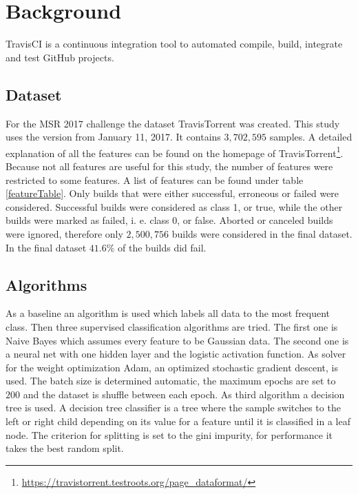 \documentclass[a4paper,11pt]{article}
\begin{document}
\section{Background}

TravisCI is a continuous integration tool to automated compile, build, integrate and test GitHub projects. 

\subsection{Dataset}

For the MSR 2017 challenge the dataset TravisTorrent was created. This study uses the version from January 11, 2017. It contains $3,702,595$ samples. A detailed explanation of all the features can be found on the homepage of TravisTorrent\footnote{\url{https://travistorrent.testroots.org/page_dataformat/}}. Because not all features are useful for this study, the number of features were restricted to some features. A list of features can be found under table \ref{featureTable}. Only builds that were either successful, erroneous or failed were considered. Successful builds were considered as class 1, or true, while the other builds were marked as failed, i. e. class 0, or false. Aborted or canceled builds were ignored, therefore only $2,500,756$ builds were considered in the final dataset. In the final dataset $41.6\%$ of the builds did fail. 


\subsection{Algorithms}

As a baseline an algorithm is used which labels all data to the most frequent class. Then three supervised classification algorithms are tried. 
The first one is Naive Bayes which assumes every feature to be Gaussian data. 
The second one is a neural net with one hidden layer and the logistic activation function. As solver for the weight optimization Adam\cite{adam}, an optimized stochastic gradient descent, is used. The batch size is determined automatic, the maximum epochs are set to $200$ and the dataset is shuffle between each epoch.
As third algorithm a decision tree is used. A decision tree classifier is a tree where the sample switches to the left or right child depending on its value for a feature until it is classified in a leaf node. The criterion for splitting is set to the gini impurity, for performance it takes the best random split. 
\end{document}
